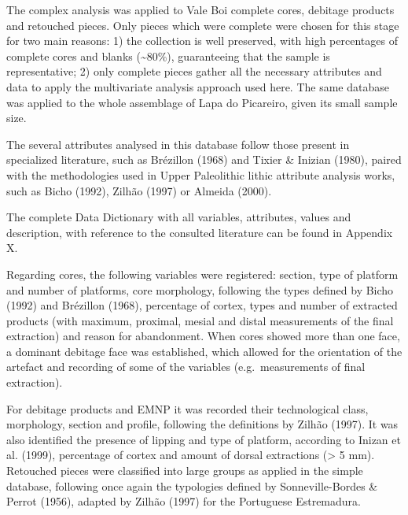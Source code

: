 \documentclass[12pt,twoside]{reedthesis}
\begin{document}
The complex analysis was applied to Vale Boi complete cores, debitage products and retouched pieces. Only pieces which were complete were chosen for this stage for two main reasons: 1) the collection is well preserved, with high percentages of complete cores and blanks (\textasciitilde80\%), guaranteeing that the sample is representative; 2) only complete pieces gather all the necessary attributes and data to apply the multivariate analysis approach used here. The same database was applied to the whole assemblage of Lapa do Picareiro, given its small sample size.

The several attributes analysed in this database follow those present in specialized literature, such as Brézillon (1968) and Tixier \& Inizian (1980), paired with the methodologies used in Upper Paleolithic lithic attribute analysis works, such as Bicho (1992), Zilhão (1997) or Almeida (2000).

The complete Data Dictionary with all variables, attributes, values and description, with reference to the consulted literature can be found in Appendix X.

Regarding cores, the following variables were registered: section, type of platform and number of platforms, core morphology, following the types defined by Bicho (1992) and Brézillon (1968), percentage of cortex, types and number of extracted products (with maximum, proximal, mesial and distal measurements of the final extraction) and reason for abandonment. When cores showed more than one face, a dominant debitage face was established, which allowed for the orientation of the artefact and recording of some of the variables (e.g.~measurements of final extraction).

For debitage products and EMNP it was recorded their technological class, morphology, section and profile, following the definitions by Zilhão (1997). It was also identified the presence of lipping and type of platform, according to Inizan et al. (1999), percentage of cortex and amount of dorsal extractions (\textgreater{} 5 mm). Retouched pieces were classified into large groups as applied in the simple database, following once again the typologies defined by Sonneville-Bordes \& Perrot (1956), adapted by Zilhão (1997) for the Portuguese Estremadura.
\end{document}
